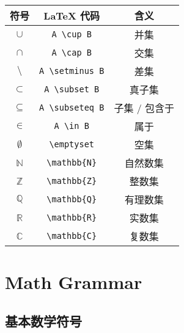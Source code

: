 \documentclass[a4paper,12pt]{article}
\begin{document}
    \begin{table}[h]
        \centering
        \begin{tabular}{|c|c|c|}
            \hline
            符号           & LaTeX 代码             & 含义       \\
            \hline
            $\cup$       & \verb|A \cup B|      & 并集       \\
            $\cap$       & \verb|A \cap B|      & 交集       \\
            $\setminus$  & \verb|A \setminus B| & 差集       \\
            $\subset$    & \verb|A \subset B|   & 真子集      \\
            $\subseteq$  & \verb|A \subseteq B| & 子集 / 包含于 \\
            $\in$        & \verb|A \in B|       & 属于       \\
            $\emptyset$  & \verb|\emptyset|     & 空集       \\
            $\mathbb{N}$ & \verb|\mathbb{N}|    & 自然数集     \\
            $\mathbb{Z}$ & \verb|\mathbb{Z}|    & 整数集      \\
            $\mathbb{Q}$ & \verb|\mathbb{Q}|    & 有理数集     \\
            $\mathbb{R}$ & \verb|\mathbb{R}|    & 实数集      \\
            $\mathbb{C}$ & \verb|\mathbb{C}|    & 复数集      \\
            \hline
        \end{tabular}\label{tab:table}
    \end{table}


    \section{Math Grammar}

    \subsection{基本数学符号}
\end{document}
